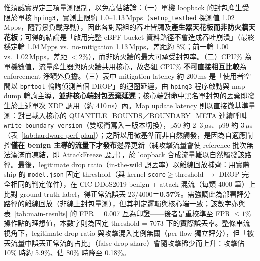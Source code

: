 \documentclass[12pt, a4paper, fontset=none]{ctexart}
\newcommand{\code}[1]{\texttt{#1}}
\begin{document}
惟須誠實界定三項量測限制，以免高估結論：（一）單機 loopback 的封包產生受限於單核 \code{hping3}，實測上限約 1.0--1.13\,Mpps（\code{setup\_testbed} 探測值 1.02\,Mpps，隨背景負載浮動），因此各對照組的吞吐皆觸及\textbf{產生器天花板而非防火牆天花板}；可得的結論是「啟用完整 eBPF bucket 資料路徑不會造成吞吐崩潰」（最終穩定輪 1.04\,Mpps vs.\ no-mitigation 1.13\,Mpps，差距約 8\%；前一輪 1.00 vs.\ 1.02\,Mpps，差距 $<2\%$），而非防火牆的最大可承受封包率。（二）CPU\% 為單機數值，流量產生器與防火牆共用核心，故各組 CPU\% \textbf{不可直接相互比較}為 enforcement 淨額外負擔。（三）表中 mitigation latency 約 200\,ms 是「使用者空間以 \code{bpftool} 輪詢偵測首個 DROP」的迴圈延遲，由 \code{hping3} 程序啟動與 map dump 輪詢主導，\textbf{並非核心端封包丟棄延遲}；核心端對命中黑名單封包的丟棄即發生於上述單次 XDP 調用（約 410\,ns）內。Map update latency 則以直接微基準量測：對已載入核心的 QUANTILE\_BOUNDS／BOUNDARY\_META 連續呼叫 \code{write\_boundary\_version}（雙緩衝寫入＋版本切換），p50 約 2--3\,$\mu$s、p99 約 3\,$\mu$s（表~\ref{tab:hardware-perf-plan}）；之所以用微基準而非自然觸發，是因為自適應閘控\textbf{僅在 benign 主導的流量下才發布}邊界更新（純攻擊流量會使 reference 批次無法湊滿而凍結，即 AttackFreeze 設計），於 loopback 合成流量難以自然觸發該路徑。最後，legitimate drop ratio（in-the-wild 誤丟率）以離線回放補齊：用實際 ship 的 \code{model.json} 固定 threshold（與 kernel \code{score}$\geq$threshold $\to$ DROP 完全相同的判定條件），在 CIC-DDoS2019 benign + attack 混流（每類 4000 筆）上比對 ground-truth label，得正常流誤丟 23/4000＝\textbf{0.57\%}。需強調此為部署評分路徑的離線回放（非線上封包量測），但其判定邏輯與核心端一致；該數字亦與表~\ref{tab:main-results} 的 FPR = 0.007 互為印證——後者是重校準至 FPR $\leq 1\%$ 操作點的理想值，本數字則為固定 threshold = 7073 下的實際誤丟率。整條串流視角下，legitimate drop ratio 與攻擊混入比例無關（per-flow 獨立評分），但「被丟流量中誤丟正常流的占比」（false-drop share）會隨攻擊稀少而上升：攻擊佔 10\% 時約 5.9\%、佔 80\% 時降至 0.18\%。
\end{document}
